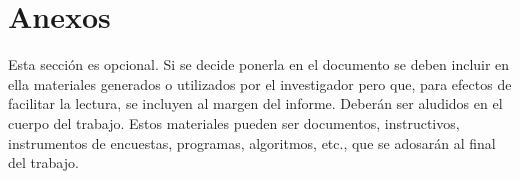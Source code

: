 \chapter*{Anexos}
\thispagestyle{empty}

Esta sección es opcional. Si se decide ponerla en el documento se deben 
incluir en ella materiales generados o utilizados por el investigador pero 
que, para efectos de facilitar la lectura, se incluyen al margen del 
informe. Deberán ser aludidos en el cuerpo del trabajo. Estos 
materiales pueden ser documentos, instructivos, instrumentos de encuestas, programas, algoritmos, etc., que se adosarán al final del 
trabajo.


\cleardoublepage
